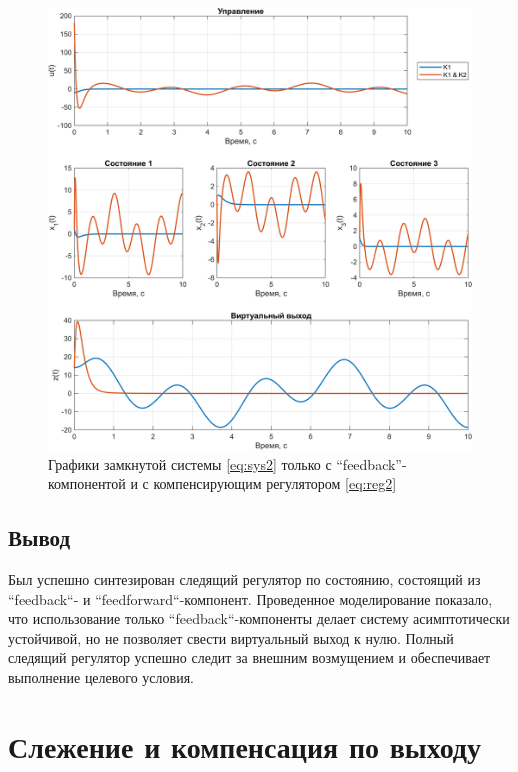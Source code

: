 \begin{figure}[H]
    \centering
    \includegraphics[width=\linewidth]{figs/task2_2.png}
    \caption{Графики замкнутой системы \eqref{eq:sys2} только с ``feedback''-компонентой
    и с компенсирующим регулятором \eqref{eq:reg2}}
    \label{fig:2.2}
\end{figure}

\subsection{Вывод}

Был успешно синтезирован следящий регулятор по состоянию, состоящий 
из ``feedback``- и ``feedforward``-компонент. Проведенное моделирование 
показало, что использование только ``feedback``-компоненты делает 
систему асимптотически устойчивой, но не позволяет свести виртуальный 
выход к нулю. Полный следящий регулятор успешно следит за внешним
возмущением и обеспечивает выполнение целевого условия.


\newpage
\section{Слежение и компенсация по выходу}

